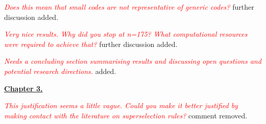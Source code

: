 \documentclass[11pt,oneside]{article}
\newcommand{\danbrowne}[1]{\vspace{10pt}\noindent\textcolor{red}{{\it #1}}}
\begin{document}
\danbrowne{Does this mean that small codes are not representative of generic codes?}
further discussion added.


\danbrowne{Very nice results. Why did you stop at n=175? What computational resources were required to achieve that?}
further discussion added.


\danbrowne{Needs a concluding section summarising results and discussing open questions and potential research directions. }
added.

{\vspace{20pt}\noindent \bf \underline{Chapter 3.}}

\danbrowne{This justification seems a little vague. Could you make it better justified by making contact with the literature on superselection rules?}
comment removed.

\end{document}
